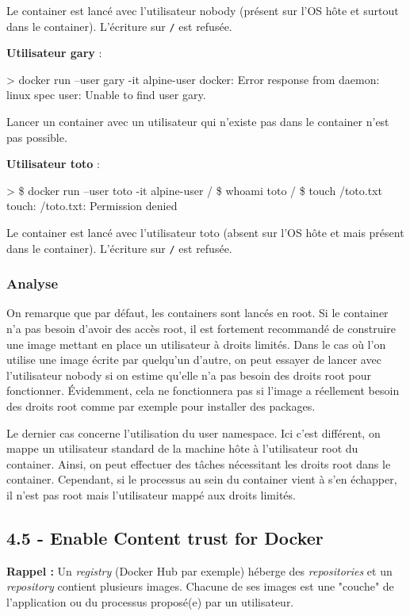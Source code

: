 \documentclass[11pt,a4paper,oneside]{report}
\newcommand{\code}[1]{\texttt{#1}}
\begin{document}
Le container est lancé avec l'utilisateur nobody (présent sur l'OS hôte et surtout dans le container). L'écriture sur \code{/} est refusée.


\textbf{Utilisateur gary} :
\begin{textcode}
> docker run --user gary -it alpine-user
docker: Error response from daemon: linux spec user: Unable to find user gary.
\end{textcode}

Lancer un container avec un utilisateur qui n'existe pas dans le container n'est pas possible.

\textbf{Utilisateur toto} :
\begin{textcode}
> \$ docker run --user toto -it alpine-user
/ \$ whoami
toto
/ \$ touch /toto.txt
touch: /toto.txt: Permission denied
\end{textcode}

Le container est lancé avec l'utilisateur toto (absent sur l'OS hôte et mais présent dans le container). L'écriture sur \code{/} est refusée.

\subsubsection{Analyse}
On remarque que par défaut, les containers sont lancés en root. Si le container n'a pas besoin d'avoir des accès root, il est fortement recommandé de construire une image mettant en place un utilisateur à droits limités. Dans le cas où l'on utilise une image écrite par quelqu'un d'autre, on peut essayer de lancer avec l'utilisateur nobody si on estime qu'elle n'a pas besoin des droits root pour fonctionner. Évidemment, cela ne fonctionnera pas si l'image a réellement besoin des droits root comme par exemple pour installer des packages.

Le dernier cas concerne l'utilisation du user namespace. Ici c'est différent, on mappe un utilisateur standard de la machine hôte à l'utilisateur root du container. Ainsi, on peut effectuer des tâches nécessitant les droits root dans le container. Cependant, si le processus au sein du container vient à s'en échapper, il n'est pas root mais l'utilisateur mappé aux droits limités.


\subsection{4.5  - Enable Content trust for Docker}\label{ssc-content-trust}
\textbf{Rappel :} Un \textit{registry} (Docker Hub par exemple) héberge des \textit{repositories} et un \textit{repository} contient plusieurs images. Chacune de ses images est une "couche" de l'application ou du processus proposé(e) par un utilisateur.
\end{document}

